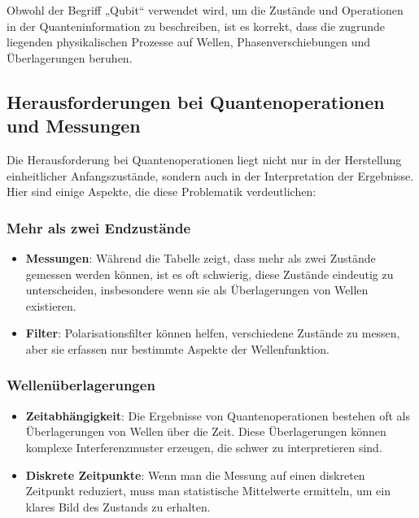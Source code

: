 \documentclass[12pt,a4paper]{article}
\begin{document}
	Obwohl der Begriff „Qubit“ verwendet wird, um die Zustände und Operationen in der Quanteninformation zu beschreiben, ist es korrekt, dass die zugrunde liegenden physikalischen Prozesse auf Wellen, Phasenverschiebungen und Überlagerungen beruhen.
	
	
	
	\subsection{Herausforderungen bei Quantenoperationen und Messungen}
	
	Die Herausforderung bei Quantenoperationen liegt nicht nur in der Herstellung einheitlicher Anfangszustände, sondern auch in der Interpretation der Ergebnisse. Hier sind einige Aspekte, die diese Problematik verdeutlichen:
	
	\subsubsection{Mehr als zwei Endzustände}
	\begin{itemize}
		\item \textbf{Messungen}: Während die Tabelle zeigt, dass mehr als zwei Zustände gemessen werden können, ist es oft schwierig, diese Zustände eindeutig zu unterscheiden, insbesondere wenn sie als Überlagerungen von Wellen existieren.
		\item \textbf{Filter}: Polarisationsfilter können helfen, verschiedene Zustände zu messen, aber sie erfassen nur bestimmte Aspekte der Wellenfunktion.
	\end{itemize}
	
	\subsubsection{Wellenüberlagerungen}
	\begin{itemize}
		\item \textbf{Zeitabhängigkeit}: Die Ergebnisse von Quantenoperationen bestehen oft als Überlagerungen von Wellen über die Zeit. Diese Überlagerungen können komplexe Interferenzmuster erzeugen, die schwer zu interpretieren sind.
		\item \textbf{Diskrete Zeitpunkte}: Wenn man die Messung auf einen diskreten Zeitpunkt reduziert, muss man statistische Mittelwerte ermitteln, um ein klares Bild des Zustands zu erhalten.
	\end{itemize}
	
\end{document}
